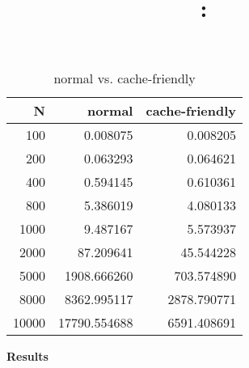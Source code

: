 \documentclass{article}
\title{
	\vspace{2in}
	\textmd{\textbf{\hmwkClass:\ \hmwkTitle}}\\
	\vspace{3in}
}
\author{\textbf{\hmwkAuthorName}}
\date{} %
\begin{document}



\begin{table}[h]
	\caption{normal vs. cache-friendly }
	\begin{center}
	\begin{tabular}{| r | r | r |}
		\hline
		N & normal & cache-friendly \\ \hline
		100&0.008075 & 0.008205 \\ \hline
		200&0.063293&0.064621 \\ \hline
		400&0.594145&0.610361 \\ \hline
		800&5.386019&4.080133 \\ \hline
		1000&9.487167&5.573937 \\ \hline
		2000&87.209641&45.544228 \\ \hline
		5000&1908.666260&703.574890 \\ \hline
		8000&8362.995117&2878.790771 \\ \hline
		10000&17790.554688&6591.408691 \\ \hline
	\end{tabular}
\end{center}
\end{table}
\newpage
\textbf{Results}
\end{document}
